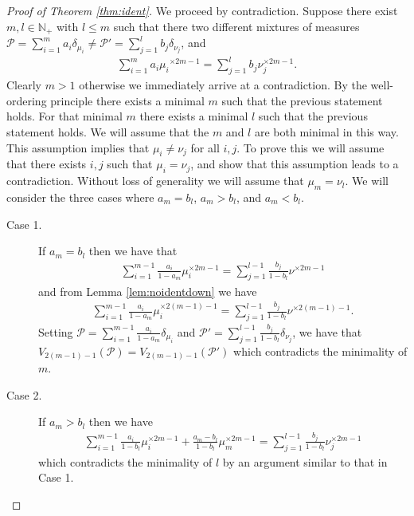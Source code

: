 \documentclass[aos,preprint]{imsart}
\def\sP{\mathscr{P}}
\theoremstyle{plain}
\theoremstyle{defintion}
\begin{document}
	\begin{proof}[Proof of Theorem \ref{thm:ident}]
		We proceed by contradiction. Suppose there exist $m,l\in \mathbb{N}_+$ with $l\le m$ such that there two different mixtures of measures $\sP = \sum_{i=1}^m a_i\delta_{\mu_i}  \neq \sP' = \sum_{j=1}^l b_j\delta_{\nu_j}$, and
		\begin{eqnarray} 
			\sum_{i=1}^{m} a_i {\mu_i}^{\times 2m-1} = \sum_{j=1}^{l} b_j {\nu}_j^{\times 2m-1}. \label{grr}
		\end{eqnarray}
		Clearly $m>1$ otherwise we immediately arrive at a contradiction. By the well-ordering principle there exists a minimal $m$ such that the previous statement holds. For that minimal $m$ there exists a minimal $l$ such that the previous statement holds. We will assume that the $m$ and $l$ are both minimal in this way. This assumption implies that $\mu_i\neq \nu_j$ for all $i,j$. To prove this we will assume that there exists $i,j$ such that $\mu_i = \nu_j$, and show that this assumption leads to a contradiction. Without loss of generality we will assume that $\mu_m = \nu_l$. We will consider the three cases where $a_m=b_l$, $a_m>b_l$, and $a_m<b_l$.
		\begin{description}	
			\item[Case 1.] If $a_m = b_l$ then we have that
				\begin{eqnarray*}
					\sum_{i = 1}^{m-1}\frac{a_i}{1-a_m} \mu_i^{\times 2m-1} = \sum_{j=1}^{l-1}\frac{b_j}{1-b_l}\nu^{\times 2m-1}
				\end{eqnarray*}
				and from Lemma \ref{lem:noidentdown} we have
				\begin{eqnarray*}
					\sum_{i = 1}^{m-1}\frac{a_i}{1-a_m} \mu_i^{\times 2(m-1)-1} = \sum_{j=1}^{l-1}\frac{b_j}{1-b_l}\nu^{\times 2(m-1)-1}.
				\end{eqnarray*}
				Setting $\sP = \sum_{i=1}^{m-1} \frac{a_i}{1-a_m} \delta_{\mu_i}$ and $\sP' = \sum_{j=1}^{l-1} \frac{b_j}{1-b_l} \delta_{\nu_j}$, we have that $V_{2\left( m-1 \right) - 1} \left( \sP \right) = V_{2\left( m-1 \right)-1}\left( \sP' \right)$ which contradicts the minimality of $m$.
			\item[Case 2.]If $a_m >b_l$ then we have
				\begin{eqnarray*}
					\sum_{i=1}^{m-1} \frac{a_i}{1-b_l} \mu_i^{\times 2m-1} + \frac{a_m - b_l}{1-b_l}\mu_m^{\times 2m-1} = \sum_{j=1}^{l-1} \frac{b_j}{1-b_l}\nu_j^{\times 2m-1}
				\end{eqnarray*}
				which contradicts the minimality of $l$ by an argument similar to that in Case 1.

\end{description}
\end{proof}
\end{document}
